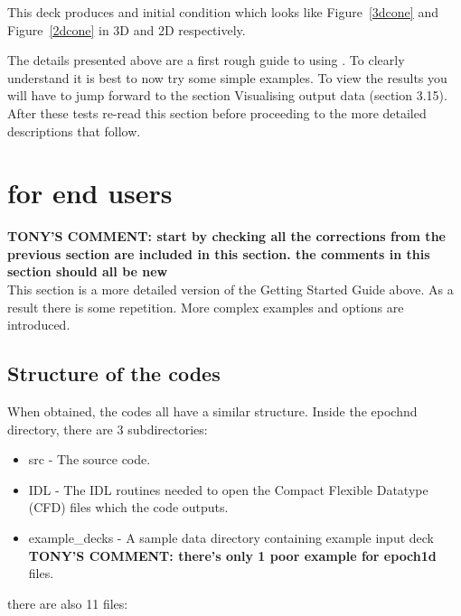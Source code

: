 \documentclass[12pt,a4paper]{article}
\newcommand{\EPOCH}{{\color{warwickdark}\fontfamily{phv}\selectfont{EPOCH}}}
\newcommand{\tony}[1]{{\color{warwickred} \bf{TONY'S COMMENT:} \bf{#1}}\\}
\begin{document}
This deck produces and initial condition which looks like Figure~\ref{3dcone}
and Figure~\ref{2dcone} in 3D and 2D respectively.

The details presented above are a first rough guide to using {\EPOCH}. To
clearly understand {\EPOCH} it is best to now try some simple examples. To
view the results you will have to jump forward to the section
Visualising {\EPOCH} output data (section 3.15). After these tests re-read
this section before proceeding to the more detailed descriptions that follow.


\clearpage

\section{{\EPOCH} for end users}
\tony{start by checking all the corrections from the previous section are
included in this section. the comments in this section should all be new}
This section is a more detailed version of the Getting Started Guide above. As
a result there is some repetition. More complex examples and options are
introduced.
\label{sec:endusers}

\subsection{Structure of the {\EPOCH} codes}
When obtained, the {\EPOCH} codes all have a similar structure. Inside the
epoch{n}d directory, there are 3 subdirectories:

\begin{itemize}
\item src - The {\EPOCH} source code.
\item IDL - The IDL routines needed to open the Compact Flexible Datatype
  (CFD) files which the code outputs.
\item example\_decks - A sample data directory containing example input deck
\tony{there's only 1 poor example for epoch1d}
  files.
\end{itemize}

there are also 11 files:
\end{document}
